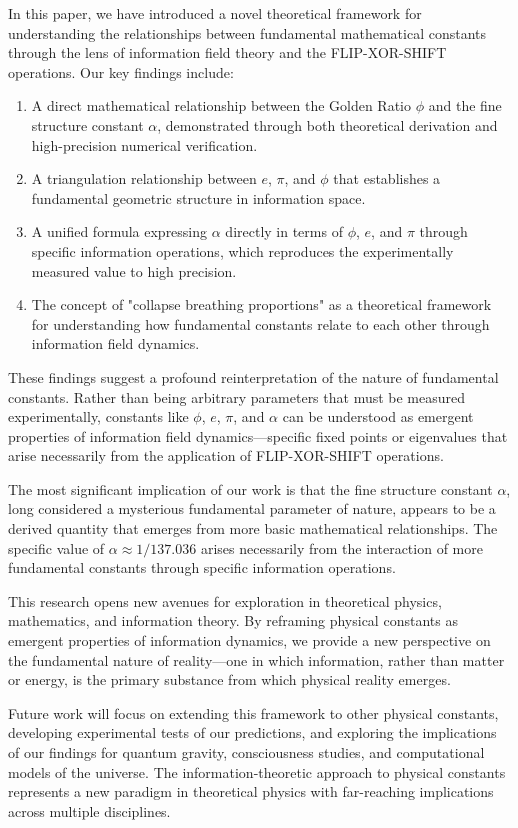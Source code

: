 In this paper, we have introduced a novel theoretical framework for understanding the relationships between fundamental mathematical constants through the lens of information field theory and the FLIP-XOR-SHIFT operations. Our key findings include:

\begin{enumerate}
    \item A direct mathematical relationship between the Golden Ratio $\phi$ and the fine structure constant $\alpha$, demonstrated through both theoretical derivation and high-precision numerical verification.
    
    \item A triangulation relationship between $e$, $\pi$, and $\phi$ that establishes a fundamental geometric structure in information space.
    
    \item A unified formula expressing $\alpha$ directly in terms of $\phi$, $e$, and $\pi$ through specific information operations, which reproduces the experimentally measured value to high precision.
    
    \item The concept of "collapse breathing proportions" as a theoretical framework for understanding how fundamental constants relate to each other through information field dynamics.
\end{enumerate}

These findings suggest a profound reinterpretation of the nature of fundamental constants. Rather than being arbitrary parameters that must be measured experimentally, constants like $\phi$, $e$, $\pi$, and $\alpha$ can be understood as emergent properties of information field dynamics—specific fixed points or eigenvalues that arise necessarily from the application of FLIP-XOR-SHIFT operations.

The most significant implication of our work is that the fine structure constant $\alpha$, long considered a mysterious fundamental parameter of nature, appears to be a derived quantity that emerges from more basic mathematical relationships. The specific value of $\alpha \approx 1/137.036$ arises necessarily from the interaction of more fundamental constants through specific information operations.

This research opens new avenues for exploration in theoretical physics, mathematics, and information theory. By reframing physical constants as emergent properties of information dynamics, we provide a new perspective on the fundamental nature of reality—one in which information, rather than matter or energy, is the primary substance from which physical reality emerges.

Future work will focus on extending this framework to other physical constants, developing experimental tests of our predictions, and exploring the implications of our findings for quantum gravity, consciousness studies, and computational models of the universe. The information-theoretic approach to physical constants represents a new paradigm in theoretical physics with far-reaching implications across multiple disciplines. 